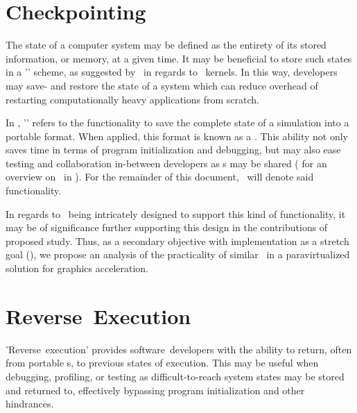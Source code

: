 \section{Checkpointing}
\label{sec:researchquestions_checkpointing}
The state of a computer system may be defined as the entirety of its stored information, or memory, at a given time.
It may be beneficial to store such states in a '\termcheckpointrestart ' scheme, as suggested by \ in regards to \termcuda\ kernels. 
In this way, developers may save- and restore the state of a system which can reduce overhead of restarting computationally heavy applications from scratch.

In \termsimics , '\termcheckpointing ' refers to the functionality to save the complete state of a simulation into a portable format.
When applied, this format is known as a \termcheckpoint .
This ability not only  saves time in terms of program initialization and debugging, but may also ease testing and collaboration in-between developers as \termcheckpoint s may be shared ( for an overview on \termcheckpointing\ in \termsimics ).
For the remainder of this document, \termcheckpointing\ will denote said functionality.

In regards to \termsimics\ being intricately designed to support this kind of functionality, it may be of significance further supporting this design in the contributions of proposed study.
Thus, as a secondary objective with implementation as a stretch goal (), we propose an analysis of the practicality of similar \termcheckpointing\ in a paravirtualized solution for graphics acceleration.

\section{Reverse~Execution}
\label{sec:researchquestions_reverseexecution}
'Reverse~execution' provides software~developers with the ability to return, often from portable \termcheckpoint s, to previous states of execution.
This may be useful when debugging, profiling, or testing as difficult-to-reach system states may be stored and returned to, effectively bypassing program initialization and other hindrances.

